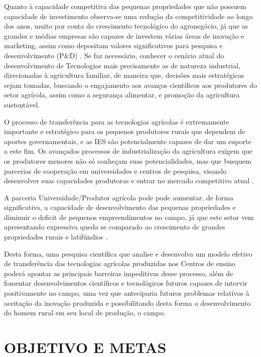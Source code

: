 Quanto à capacidade competitiva das pequenas propriedades que não possuem capacidade de investimento observa-se uma redução da competitividade ao longo dos anos, muito por conta do crescimento tecnológico do agronegócio, já que as grandes e médias empresas são capazes de investem várias áreas de inovação e marketing, assim como depositam valores significativos para pesquisa e desenvolvimento (P\&D) \cite{kitchenko_decision_2019}. Se faz necessário, conhecer o cenário atual do desenvolvimento de Tecnologias  mais precisamente as de natureza industrial, direcionadas à agricultura familiar, de maneira que, decisões mais estratégicas sejam tomadas, buscando o engajamento aos avanços científicos aos produtores do setor agrícola, assim como a segurança alimentar, e promoção da agricultura sustentável.

O processo de transferência para as tecnologias agrícolas é extremamente importante e  estratégico para os pequenos produtores rurais que dependem de aportes governamentais, e as IES são potencialmente  capazes de dar um suporte a este fim. Os avançados processos de industrialização da agricultura exigem que os produtores menores não só conheçam suas potencialidades, mas que busquem parcerias de cooperação em universidades e centros de pesquisa, visando desenvolver suas capacidades produtoras e entrar no mercado competitivo atual \cite{silva_modelo_2016}.

A parceria Universidade/Produtor agrícola pode pode aumentar, de forma significativa, a capacidade de desenvolvimento das pequenas propriedades e diminuir o deficit de pequenos empreendimentos no campo, já que este setor vem apresentando expressiva queda se comparado ao crescimento de grandes propriedades rurais e latifúndios \cite{culhane_learning_2016,jabbour_instructor_2019,gunasekera_experiences_2018}. 

Desta forma, uma pesquisa científica que analise e desenvolva um modelo efetivo de transferência das tecnologias agrícolas produzidas nos Centros de ensino poderá apontar as principais barreiras impeditivas desse processo, além de fomentar desenvolvimentos científicos e tecnológicos futuros capazes de intervir positivamente no campo, uma vez que anteciparia futuros problemas relativos à aceitação da inovação produzida e possibilitando desta forma o desenvolvimento do homem rural em seu local de produção, o campo.

\section{OBJETIVO E METAS}

